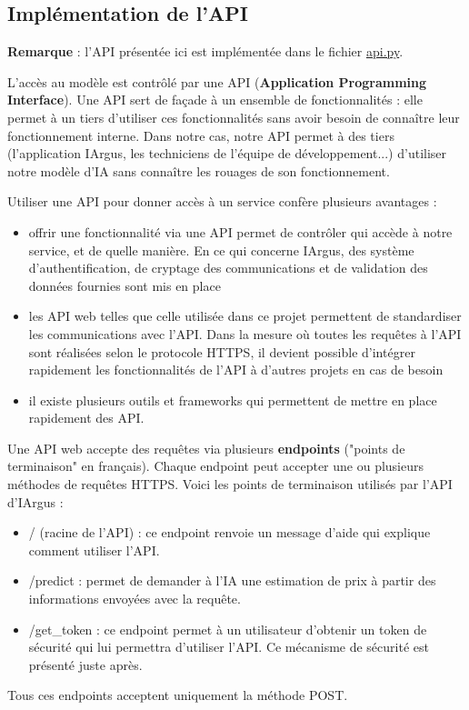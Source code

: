\documentclass[french]{article}
\begin{document}
    \subsection{Implémentation de l'API}

    \textbf{Remarque} : l'API présentée ici est implémentée dans le fichier \href{https://github.com/vinpap/iargus/blob/8e63c88368532a1a424799e698f20b873ee2dc4f/api.py}{api.py}.

    L'accès au modèle est contrôlé par une API (\textbf{Application Programming Interface}). Une API sert de façade à un ensemble de fonctionnalités : elle permet à un tiers d'utiliser ces fonctionnalités sans avoir besoin de connaître leur fonctionnement interne. Dans notre cas, notre API permet à des tiers (l'application IArgus, les techniciens de l'équipe de développement...) d'utiliser notre modèle d'IA sans connaître les rouages de son fonctionnement.

    Utiliser une API pour donner accès à un service confère plusieurs avantages :
    \begin{itemize}
        \item offrir une fonctionnalité via une API permet de contrôler qui accède à notre service, et de quelle manière. En ce qui concerne IArgus, des système d'authentification, de cryptage des communications et de validation des données fournies sont mis en place
        \item les API web telles que celle utilisée dans ce projet permettent de standardiser les communications avec l'API. Dans la mesure où toutes les requêtes à l'API sont réalisées selon le protocole HTTPS, il devient possible d'intégrer rapidement les fonctionnalités de l'API à d'autres projets en cas de besoin
        \item il existe plusieurs outils et frameworks qui permettent de mettre en place rapidement des API. 
    \end{itemize}
    Une API web accepte des requêtes via plusieurs \textbf{endpoints} ("points de terminaison" en français). Chaque endpoint peut accepter une ou plusieurs méthodes de requêtes HTTPS. Voici les points de terminaison utilisés par l'API d'IArgus :
    \begin{itemize}
        \item / (racine de l'API) : ce endpoint renvoie un message d'aide qui explique comment utiliser l'API.
        \item /predict : permet de demander à l'IA une estimation de prix à partir des informations envoyées avec la requête.
        \item /get\_token : ce endpoint permet à un utilisateur d'obtenir un token de sécurité qui lui permettra d'utiliser l'API. Ce mécanisme de sécurité est présenté juste après.
    \end{itemize}
    Tous ces endpoints acceptent uniquement la méthode POST.
\end{document}

